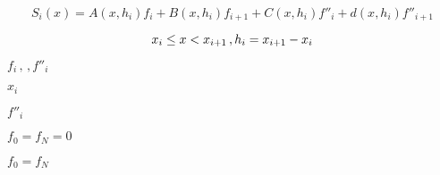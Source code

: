 \documentclass{article}
\begin{document}
\[ S_i(x) = A(x,h_i) f_i + B(x,h_i) f_{i+1} + C(x,h_i) f''_i + d(x,h_i) f''_{i+1} \]
\pagebreak

\[ x_i \le x < x_{i+1}\,,\\ h_i = x_{i+1} - x_{i} \]
\pagebreak

$f_i\,,\,,f''_i$
\pagebreak

$x_i$
\pagebreak

$f''_i$
\pagebreak

$f_0=f_N=0$
\pagebreak

$f_0=f_N$
\pagebreak
\end{document}

